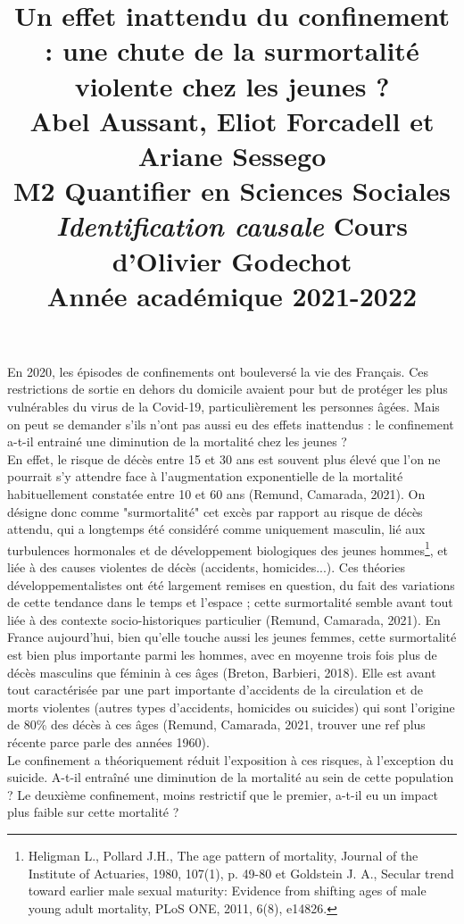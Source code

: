 \documentclass{article}
\title{\centering 

\vspace{1 cm}

{\begin{minipage}\linewidth
        \centering
     \textbf{Un effet inattendu du confinement : une chute de la surmortalité violente chez les jeunes ?} \\[1 cm] 
        \vspace{0.5cm}
        \large Abel Aussant, Eliot Forcadell et Ariane Sessego\\
         M2 Quantifier en Sciences Sociales\\
        \vspace{0.5cm}
         \textit{Identification causale} Cours d'Olivier Godechot \\
         Année académique 2021-2022\\
    \end{minipage}}
  }
\date{}
\begin{document}

\maketitle

\cleardoublepage%

En 2020, les épisodes de confinements ont bouleversé la vie des Français. Ces restrictions de sortie en dehors du domicile avaient pour but de protéger les plus vulnérables du virus de la Covid-19, particulièrement les personnes âgées. Mais on peut se demander s'ils n'ont pas aussi eu des effets inattendus : le confinement a-t-il entrainé une diminution de la mortalité chez les jeunes ? \\

En effet, le risque de décès entre 15 et 30 ans est souvent plus élevé que l'on ne pourrait s'y attendre face à l'augmentation exponentielle de la mortalité habituellement constatée entre 10 et 60 ans (Remund, Camarada, 2021). On désigne donc comme "surmortalité" cet excès par rapport au risque de décès attendu, qui a longtemps été considéré comme uniquement masculin, lié aux turbulences hormonales et de développement biologiques des jeunes hommes\footnote{Heligman L., Pollard J.H., The age pattern of mortality, Journal of the Institute of Actuaries, 1980, 107(1), p. 49-80 et  Goldstein J. A., Secular trend toward earlier male sexual maturity: Evidence from shifting ages of male young adult mortality, PLoS ONE, 2011, 6(8), e14826.}, et liée à des causes violentes de décès (accidents, homicides...). Ces théories développementalistes ont été largement remises en question, du fait des variations de cette tendance dans le temps et l'espace ; cette surmortalité semble avant tout liée à des contexte socio-historiques particulier (Remund, Camarada, 2021). En France aujourd'hui, bien qu'elle touche aussi les jeunes femmes, cette surmortalité est bien plus importante parmi les hommes, avec en moyenne trois fois plus de décès masculins que féminin à ces âges (Breton, Barbieri, 2018). Elle est avant tout caractérisée par une part importante d'accidents de la circulation et de morts violentes (autres types d'accidents, homicides ou suicides) qui sont l'origine de 80\% des décès à ces âges (Remund, Camarada, 2021, trouver une ref plus récente parce parle des années 1960). \\

Le confinement a théoriquement réduit l'exposition à ces risques, à l'exception du suicide. A-t-il entraîné une diminution de la mortalité au sein de cette population ? Le deuxième confinement, moins restrictif que le premier, a-t-il eu un impact plus faible sur cette mortalité ? \\
\end{document}
